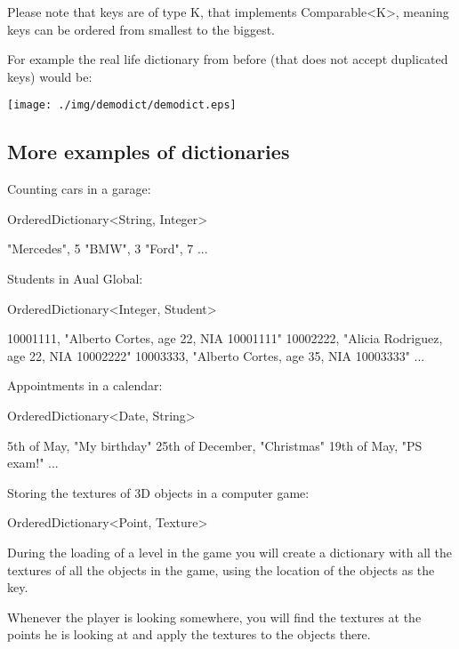 \documentclass[a4paper, 9pt]{extarticle}
\newcommand{\separator}{\begin{center}%
\noindent\makebox[\linewidth]{\rule{0.75\paperwidth}{0.4pt}}%
\end{center}}
\begin{document}
Please note that keys are of type K, that implements Comparable<K>, meaning
keys can be ordered from smallest to the biggest.

For example the real life dictionary from before (that does not accept duplicated keys) would be:

\begin{center}
  \texttt{[image: ./img/demodict/demodict.eps]}
\end{center}

\subsection{More examples of dictionaries}

Counting cars in a garage:

\begin{blackboard}
OrderedDictionary<String, Integer>

"Mercedes", 5
"BMW", 3
"Ford", 7
...
\end{blackboard}

\separator

Students in Aual Global:

\begin{blackboard}
OrderedDictionary<Integer, Student>

10001111, "Alberto Cortes, age 22, NIA 10001111"
10002222, "Alicia Rodriguez, age 22, NIA 10002222"
10003333, "Alberto Cortes, age 35, NIA 10003333"
...
\end{blackboard}

\separator

Appointments in a calendar:

\begin{blackboard}
OrderedDictionary<Date, String>

5th of May, "My birthday"
25th of December, "Christmas"
19th of May, "PS exam!"
...
\end{blackboard}

\separator

Storing the textures of 3D objects in a computer game:

\begin{blackboard}
OrderedDictionary<Point, Texture>
\end{blackboard}

During the loading of a level in the game you will create a dictionary with all
the textures of all the objects in the game, using the location of the objects
as the key.

Whenever the player is looking somewhere, you will find the textures at the
points he is looking at and apply the textures to the objects there.
\end{document}
